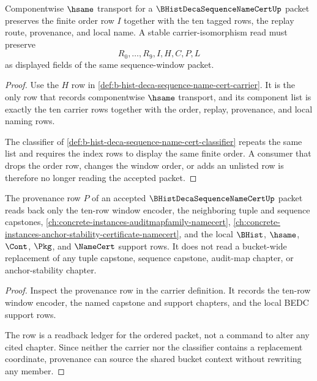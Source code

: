 \begin{theorem}
\label{thm:b-hist-deca-sequence-name-cert-index-stability}
Componentwise $\hsame$ transport for a $\BHistDecaSequenceNameCertUp$ packet preserves the finite order row $I$ together with the ten tagged rows, the replay route, provenance, and local name. A stable carrier-isomorphism read must preserve
$$
R_0,\ldots,R_9,I,H,C,P,L
$$
as displayed fields of the same sequence-window packet.
\end{theorem}
\begin{proof}
Use the $H$ row in \autoref{def:b-hist-deca-sequence-name-cert-carrier}. It is the only row that records componentwise $\hsame$ transport, and its component list is exactly the ten carrier rows together with the order, replay, provenance, and local naming rows.

The classifier of \autoref{def:b-hist-deca-sequence-name-cert-classifier} repeats the same list and requires the index rows to display the same finite order. A consumer that drops the order row, changes the window order, or adds an unlisted row is therefore no longer reading the accepted packet.
\end{proof}

\begin{theorem}
\label{thm:b-hist-deca-sequence-name-cert-provenance-readback}
The provenance row $P$ of an accepted $\BHistDecaSequenceNameCertUp$ packet reads back only the ten-row window encoder, the neighboring tuple and sequence capstones, \autoref{ch:concrete-instances-auditmapfamily-namecert}, \autoref{ch:concrete-instances-anchor-stability-certificate-namecert}, and the local $\BHist$, $\hsame$, $\Cont$, $\Pkg$, and $\NameCert$ support rows. It does not read a bucket-wide replacement of any tuple capstone, sequence capstone, audit-map chapter, or anchor-stability chapter.
\end{theorem}
\begin{proof}
Inspect the provenance row in the carrier definition. It records the ten-row window encoder, the named capstone and support chapters, and the local BEDC support rows.

The row is a readback ledger for the ordered packet, not a command to alter any cited chapter. Since neither the carrier nor the classifier contains a replacement coordinate, provenance can source the shared bucket context without rewriting any member.
\end{proof}

